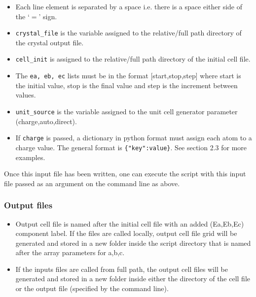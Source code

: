 \begin{itemize}
	\item Each line element is separated by a space i.e. there is a space either side of the `$=$' sign.
	\item \texttt{crystal\_file} is the variable assigned to the relative/full path directory of the crystal output file.
	\item \texttt{cell\_init} is assigned to the relative/full path directory of the initial cell file.
	\item The \texttt{ea, eb, ec} lists must be in the format [start,stop,step] where start is the initial value, stop is the final value and step is the increment between values.
	\item \texttt{unit\_source} is the variable assigned to the unit cell generator parameter (charge,auto,direct).
	\item If \texttt{charge} is passed, a dictionary in python format must assign each atom to a charge value. The general format is \texttt{\{"key":value\}}. See section 2.3 for more examples.
	
\end{itemize}

Once this input file has been written, one can execute the script with this input file passed as an argument on the command line as above. 

\subsubsection{Output files}

\begin{itemize}
	\item Output cell file is named after the initial cell file with an added (Ea,Eb,Ec) component label. If the files are called locally, output cell file grid will be generated and stored in a new folder inside the script directory that is named after the array parameters for a,b,c.
	\item If the inputs files are called from full path, the output cell files will be generated and stored in a new folder inside either the directory of the cell file or the output file (specified by the command line).
\end{itemize}





